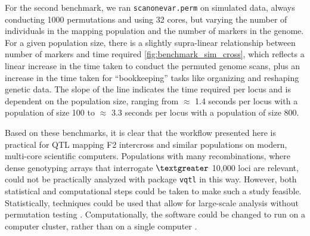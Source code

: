 For the second benchmark, we ran \texttt{scanonevar.perm} on simulated data, always conducting 1000 permutations and using 32 cores, but varying the number of individuals in the mapping population and the number of markers in the genome.
For a given population size, there is a slightly supra-linear relationship between number of markers and time required \autoref{fig:benchmark_sim_cross}, which reflects a linear increase in the time taken to conduct the permuted genome scans, plus an increase in the time taken for ``bookkeeping'' tasks like organizing and reshaping genetic data.
The slope of the line indicates the time required per locus and is dependent on the population size, ranging from $\approx$ 1.4 seconds per locus with a population of size 100 to $\approx$ 3.3 seconds per locus with a population of size 800.

Based on these benchmarks, it is clear that the workflow presented here is practical for QTL mapping F2 intercross and similar populations on modern, multi-core scientific computers.
Populations with many recombinations, where dense genotyping arrays that interrogate $\textgreater$ 10,000 loci are relevant, could not be practically analyzed with package \texttt{vqtl} in this way.
However, both statistical and computational steps could be taken to make such a study feasible.
Statistically, techniques could be used that allow for large-scale analysis without permutation testing \citep{Efron2004}.
Computationally, the software could be changed to run on a computer cluster, rather than on a single computer \citep{Jette2003a,Marchand2017}.


